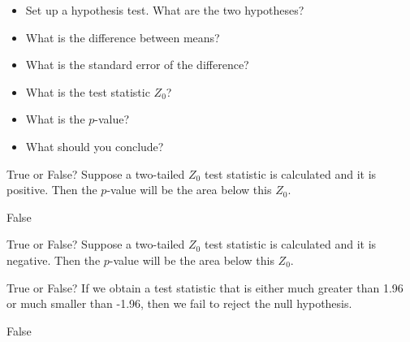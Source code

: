 \documentclass[11pt, chapterprefix=true]{scrbook}\usepackage[]{graphicx}\usepackage[]{color}
\begin{document}
\begin{exercises}
\begin{exercise}
\begin{itemize}
  \item Set up a hypothesis test. What are the two hypotheses?
  \item What is the difference between means?
  \item What is the standard error of the difference?
  \item What is the test statistic $Z_0$?
  \item What is the $p$-value?
  \item What should you conclude?
\end{itemize}

\end{exercise}
% 
% 

\begin{exercise} %

True or False? Suppose a two-tailed $Z_0$ test statistic is calculated and it is positive. Then the $p$-value will be the area below this $Z_0$.

\end{exercise}
\begin{solution} %

False

\end{solution}

\begin{exercise} %

True or False? Suppose a two-tailed $Z_0$ test statistic is calculated and it is negative. Then the $p$-value will be the area below this $Z_0$.

\end{exercise}
% 
% 

\begin{exercise} %

True or False? If we obtain a test statistic that is either much greater than 1.96 or much smaller than -1.96, then we fail to reject the null hypothesis.

\end{exercise}
\begin{solution} %

False 

\end{solution}


\begin{exercise} %


\end{exercise}
\end{exercises}
\end{document}
